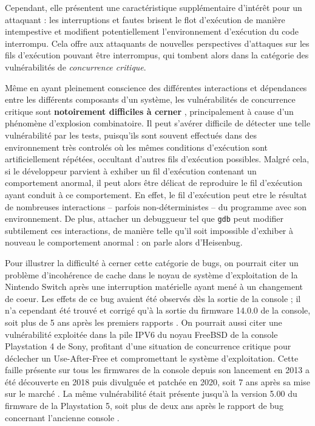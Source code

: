 Cependant, elle présentent une caractéristique supplémentaire d'intérêt pour un attaquant : les interruptions et fautes brisent le flot d'exécution de manière intempestive et modifient potentiellement l'environnement d'exécution du code interrompu. Cela offre aux attaquants de nouvelles perspectives d'attaques sur les fils d'exécution pouvant être interrompus, qui tombent alors dans la catégorie des vulnérabilités de \emph{concurrence critique}.

Même en ayant pleinement conscience des différentes interactions et dépendances entre les différents composants d'un système, les vulnérabilités de concurrence critique sont \textbf{notoirement difficiles à cerner} \cite{netzer1992race}, principalement à cause d'un phénomène d'explosion combinatoire. Il peut s'avérer difficile de détecter une telle vulnérabilité par les tests, puisqu'ils sont souvent effectués dans des environnement très controlés où les mêmes conditions d'exécution sont artificiellement répétées, occultant d'autres fils d'exécution possibles. Malgré cela, si le développeur parvient à exhiber un fil d'exécution contenant un comportement anormal, il peut alors être délicat de reproduire le fil d'exécution ayant conduit à ce comportement. En effet, le fil d'exécution peut etre le résultat de nombreuses interactions -- parfois non-déterministes -- du programme avec son environnement. De plus, attacher un debuggueur tel que \texttt{gdb} peut modifier subtilement ces interactions, de manière telle qu'il soit impossible d'exhiber à nouveau le comportement anormal : on parle alors d'Heisenbug.

Pour illustrer la difficulté à cerner cette catégorie de bugs, on pourrait citer un problème d'incohérence de cache dans le noyau de système d'exploitation de la Nintendo Switch après une interruption matérielle ayant mené à un changement de coeur. Les effets de ce bug avaient été observés dès la sortie de la console ; il n'a cependant été trouvé et corrigé qu'à la sortie du firmware 14.0.0 de la console, soit plus de 5 ans après les premiers rapports \cite{switchbug}.
On pourrait aussi citer une vulnérabilité exploitée dans la pile IPV6 du noyau FreeBSD de la console Playstation 4 de Sony, profitant d'une situation de concurrence critique pour déclecher un Use-After-Free et compromettant le système d'exploitation. Cette faille présente sur tous les firmwares de la console depuis son lancement en 2013 a été découverte en 2018 puis divulguée et patchée en 2020, soit 7 ans après sa mise sur le marché \cite{ps4bug}. La même vulnérabilité était présente jusqu'à la version 5.00 du firmware de la Playstation 5, soit plus de deux ans après le rapport de bug concernant l'ancienne console \cite{ps5bug}.


